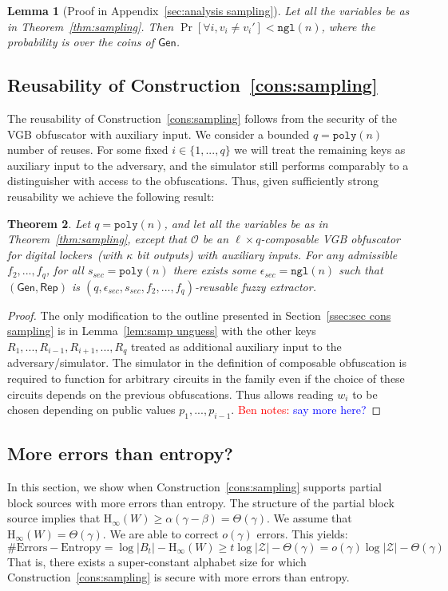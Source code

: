 \documentclass[11pt]{article}
\newcommand{\secref}[1]{\mbox{Section~\ref{#1}}}
\newcommand{\apref}[1]{\mbox{Appendix~\ref{#1}}}
\newcommand{\thref}[1]{\mbox{Theorem~\ref{#1}}}
\newcommand{\lemref}[1]{\mbox{Lemma~\ref{#1}}}
\newcommand{\consref}[1]{\mbox{Construction~\ref{#1}}}
\newcommand{\class}[1]{{\ensuremath{\mathsf{#1}}}}
\newcommand{\gen}{\ensuremath{\class{Gen}}\xspace}
\newcommand{\rep}{\ensuremath{\class{Rep}}\xspace}
\newcommand{\poly}{\ensuremath{\mathtt{poly}}\xspace}
\newcommand{\ngl}{\ensuremath{\mathtt{ngl}}\xspace}
\newcommand{\Hoo}{\mathrm{H}_\infty}
\newtheorem{theorem}{Theorem}[section]
\newtheorem{lemma}[theorem]{Lemma}
\newcommand{\authnote}[2]{{\textcolor{red}{\textsf{#1 notes: }\textcolor{blue}{ #2}}\marginpar{\textcolor{red}{\textbf{!!!!!}}}}}
\newcommand{\authnote}[2]{}
\newcommand{\bnote}[1]{{\authnote{Ben}{#1}}}
\begin{document}
\begin{lemma}[Proof in \apref{sec:analysis sampling}]
\label{lem:sampling errors}
Let all the variables be as in \thref{thm:sampling}.
 Then $\Pr[\forall i, v_i\neq v_i'] < \ngl(n)$, where the probability is over the coins of $\gen$.
\end{lemma}

\subsection{Reusability of \consref{cons:sampling}}
The reusability of \consref{cons:sampling} follows from the security of the VGB obfuscator with auxiliary input.  We consider a bounded $q = \poly(n)$ number of reuses.  For some fixed $i\in \{1,..., q\}$ we will treat the remaining keys as auxiliary input to the adversary, and the simulator still performs comparably to a distinguisher with access to the obfuscations.  Thus, given sufficiently strong reusability we achieve the following result:

\begin{theorem}
\label{thm:reusability}
Let $q = \poly(n)$, and let all the variables be as in \thref{thm:sampling}, except that $\mathcal{O}$ be an $\ell\times q$-composable VGB obfuscator for digital lockers~(with $\kappa$ bit outputs) with auxiliary inputs.  For any admissible $f_2,..., f_q$, for all $s_{sec} = \poly(n)$ there exists some $\epsilon_{sec} = \ngl(n)$ such that $(\gen, \rep)$ is $(q, \epsilon_{sec}, s_{sec}, f_2,..., f_q)$-reusable fuzzy extractor.
\end{theorem}
\begin{proof}
The only modification to the outline presented in \secref{ssec:sec cons sampling} is in \lemref{lem:samp unguess} with the other keys $R_1,..., R_{i-1}, R_{i+1}, ..., R_q$ treated as additional auxiliary input to the adversary/simulator.  The simulator in the definition of composable obfuscation is required to function for arbitrary circuits in the family even if the choice of these circuits depends on the previous obfuscations.  Thus allows reading $w_i$ to be chosen depending on public values $p_1,..., p_{i-1}$.
\bnote{say more here?}
\end{proof}

\subsection{More errors than entropy?}
In this section, we show when \consref{cons:sampling} supports partial block sources with more errors than entropy.  The structure of the partial block source implies that $\Hoo(W) \ge \alpha (\gamma-\beta ) = \Theta(\gamma)$.  We assume that $\Hoo(W) = \Theta(\gamma)$.  We are able to correct $o(\gamma)$ errors.
This yields:
\[
\text{\# Errors} - \text{Entropy} =  \log |B_t| -\Hoo(W) \ge t \log |\mathcal{Z}| - \Theta(\gamma)= o(\gamma) \log |\mathcal{Z}| - \Theta(\gamma)
\]
That is, there exists a super-constant alphabet size for which \consref{cons:sampling} is secure with more errors than entropy.  
\end{document}
